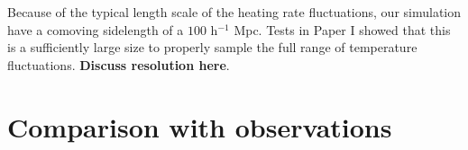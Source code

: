 \documentclass[numberedappendix]{emulateapj}
\newcommand\ALc[1]{{\color{red} \bf #1}} %
\begin{document}
Because of the typical length scale of the heating rate fluctuations, our simulation have a comoving sidelength of  a $100$ h$^{-1}$ Mpc.  Tests in Paper I showed that this is a sufficiently large size to properly sample the full range of temperature fluctuations. \ALc{Discuss resolution here}. 







\section{Comparison with observations}\label{sec:obs}
\end{document}
